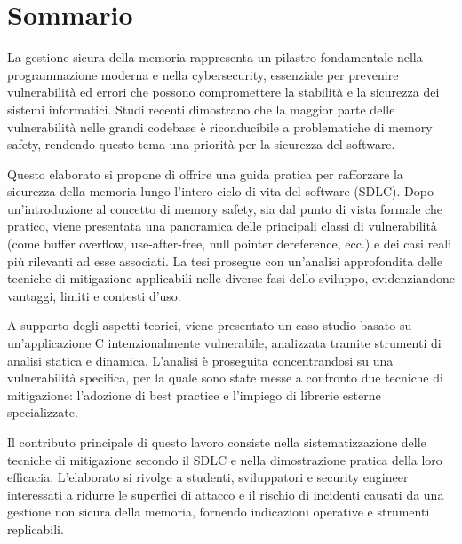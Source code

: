 \chapter*{Sommario}
\label{cha:sommario}

La gestione sicura della memoria rappresenta un pilastro fondamentale nella
programmazione moderna e nella cybersecurity, essenziale per prevenire vulnerabilità
ed errori che possono compromettere la stabilità e la sicurezza dei sistemi informatici.
Studi recenti dimostrano che la maggior parte delle vulnerabilità nelle grandi
codebase è riconducibile a problematiche di memory safety, rendendo questo tema una
priorità per la sicurezza del software.

\vspace{0.5em}
\noindent
Questo elaborato si propone di offrire una guida pratica per rafforzare la sicurezza
della memoria lungo l'intero ciclo di vita del software (SDLC). Dopo un'introduzione
al concetto di memory safety, sia dal punto di vista formale che pratico, viene
presentata una panoramica delle principali classi di vulnerabilità (come buffer overflow,
use-after-free, null pointer dereference, ecc.) e dei casi reali più rilevanti
ad esse associati. La tesi prosegue con un'analisi approfondita delle tecniche di
mitigazione applicabili nelle diverse fasi dello sviluppo, evidenziandone
vantaggi, limiti e contesti d'uso.

\vspace{0.5em}
\noindent
A supporto degli aspetti teorici, viene presentato un caso studio basato su un'applicazione
C intenzionalmente vulnerabile, analizzata tramite strumenti di analisi statica e
dinamica. L'analisi è proseguita concentrandosi su una vulnerabilità specifica, per
la quale sono state messe a confronto due tecniche di mitigazione: l'adozione di
best practice e l'impiego di librerie esterne specializzate.

\vspace{0.5em}
\noindent
Il contributo principale di questo lavoro consiste nella sistematizzazione delle
tecniche di mitigazione secondo il SDLC e nella dimostrazione pratica della loro
efficacia. L'elaborato si rivolge a studenti, sviluppatori e security engineer
interessati a ridurre le superfici di attacco e il rischio di incidenti causati
da una gestione non sicura della memoria, fornendo indicazioni operative e strumenti
replicabili.